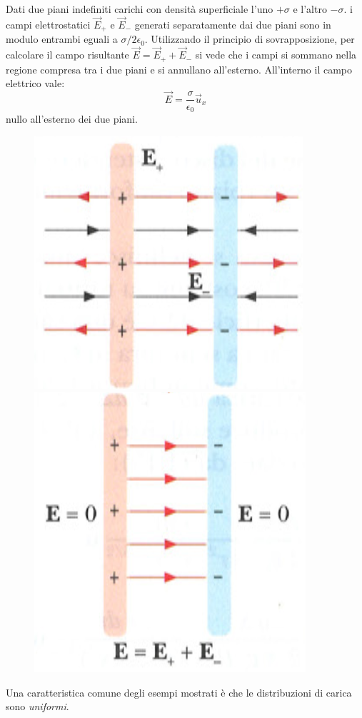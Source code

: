 \documentclass[class=book, crop=false, oneside, 12pt]{standalone}
\begin{document}
Dati due piani indefiniti carichi con densità superficiale l'uno \(+ \sigma\) e l'altro \(- \sigma\).
i campi elettrostatici \(\overrightarrow{E}_{+}\) e \(\overrightarrow{E}_{-}\) generati separatamente dai due piani sono in modulo entrambi eguali a \(\sigma / 2 \epsilon_0\).
Utilizzando il principio di sovrapposizione, per calcolare il campo risultante \(\overrightarrow{E} = \overrightarrow{E}_{+} + \overrightarrow{E}_{-}\) si vede che i campi si sommano nella regione compresa tra i due piani e si annullano all'esterno.  
All'interno il campo elettrico vale:
\begin{equation*}
    \overrightarrow{E} = \frac{\sigma}{\epsilon_0} \overrightarrow{u}_x
\end{equation*}
nullo all'esterno dei due piani.
\begin{figure}[h]
    \includegraphics[scale=0.4]{piani_carichi1.png}
    \includegraphics[scale=0.4]{piani_carichi2.png}
    \centering
    \caption{}
\end{figure}
Una caratteristica comune degli esempi mostrati è che le distribuzioni di carica sono \emph{uniformi}.
\end{document}

